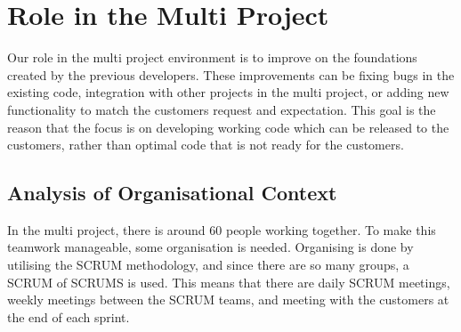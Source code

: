 \chapter{Role in the Multi Project}
Our role in the multi project environment is to improve on the foundations created by the previous developers.
These improvements can be fixing bugs in the existing code, integration with other projects in the multi project, or adding new functionality to match the customers request and expectation.
This goal is the reason that the focus is on developing working code which can be released to the customers, rather than optimal code that is not ready for the customers.


\section{Analysis of Organisational Context}
In the multi project, there is around 60 people working together. 
To make this teamwork manageable, some organisation is needed.
Organising is done by utilising the SCRUM methodology, and since there are so many groups, a SCRUM of SCRUMS is used.
This means that there are daily SCRUM meetings, weekly meetings between the SCRUM teams, and meeting with the customers at the end of each sprint.





